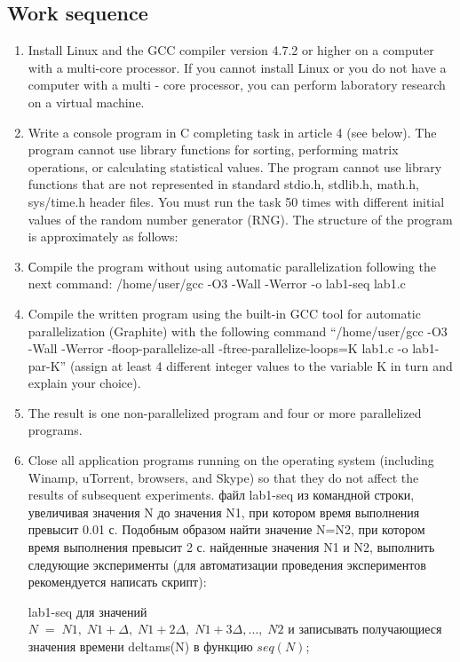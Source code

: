 { %
	\subsection{Work sequence}
	\begin{enumerate}
		\item Install Linux and the GCC compiler version 4.7.2 or higher on a computer with a multi-core processor. If you cannot install Linux or you do not have a computer with a multi - core processor, you can perform laboratory research on a virtual machine.
		\item Write a console program in C completing task in article 4 (see below). The program cannot use library functions for sorting, performing matrix operations, or calculating statistical values. The program cannot use library functions that are not represented in standard stdio.h, stdlib.h, math.h, sys/time.h header files. You must run the task 50 times with different initial values of the random number generator (RNG). The structure of the program is approximately as follows:
			\begin{figure}[H]
				
			\end{figure}
		\item Сompile the program without using automatic parallelization following the next command: /home/user/gcc -O3 -Wall -Werror -o lab1-seq lab1.c
		\item Compile the written program using the built-in GCC tool for automatic parallelization (Graphite) with the following command  “/home/user/gcc -O3 -Wall -Werror -floop-parallelize-all -ftree-parallelize-loops=K lab1.c -o lab1-par-K” (assign at least 4 different integer values to the variable K in turn and explain your choice).
		\item The result is one non-parallelized program and four or more parallelized programs.
		\item Close all application programs running on the operating system (including Winamp, uTorrent, browsers, and Skype) so that they do not affect the results of subsequent experiments.
		 файл lab1-seq из командной строки, увеличивая значения N до значения N1, при котором время выполнения превысит 0.01 с. Подобным образом найти значение N=N2, при котором время выполнения превысит 2 с.
		 найденные значения N1 и N2, выполнить следующие эксперименты (для автоматизации проведения экспериментов рекомендуется написать скрипт):
			\begin{itemize}
				 lab1-seq для значений \\$N\;=\;{N1,\;N1+\Delta,\;N1+2\Delta,\;N1+3\Delta,…,\;N2}$ и записывать получающиеся значения времени delta\textunderscore ms(N) в функцию $seq(N)$;

\end{itemize}
\end{enumerate}}

